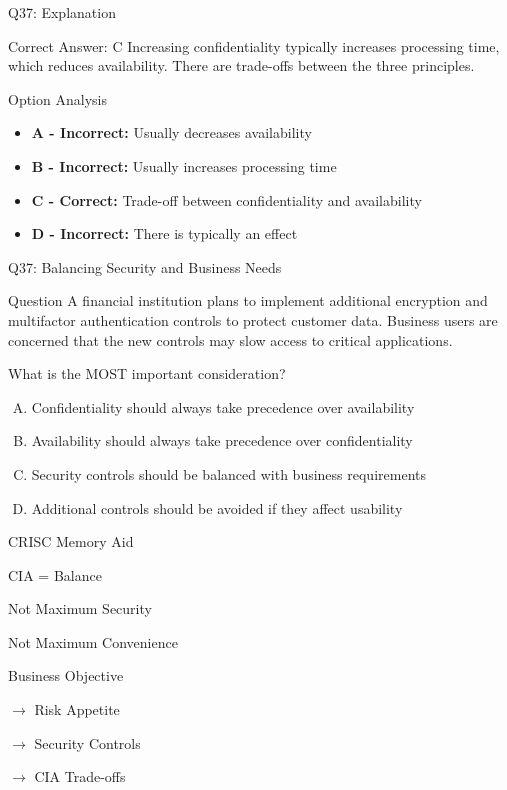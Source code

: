 \documentclass{beamer}
\begin{document}
	\begin{frame}{Q37: Explanation}
		\begin{block}{Correct Answer: C}
			Increasing confidentiality typically increases processing time, which reduces availability. There are trade-offs between the three principles.
		\end{block}
		\begin{block}{Option Analysis}
			\begin{itemize}
				\item \textbf{A - Incorrect:} Usually decreases availability
				\item \textbf{B - Incorrect:} Usually increases processing time
				\item \textbf{C - Correct:} Trade-off between confidentiality and availability
				\item \textbf{D - Incorrect:} There is typically an effect
			\end{itemize}
		\end{block}
	\end{frame}
	
	
	
	
	\begin{frame}[shrink=10]{Q37: Balancing Security and Business Needs}
		\begin{block}{Question}
			A financial institution plans to implement additional encryption
			and multifactor authentication controls to protect customer data.
			Business users are concerned that the new controls may slow access
			to critical applications.
			
			What is the MOST important consideration?
		\end{block}
		
		\begin{enumerate}[(A)]
			\item Confidentiality should always take precedence over availability
			\item Availability should always take precedence over confidentiality
			\item Security controls should be balanced with business requirements
			\item Additional controls should be avoided if they affect usability
		\end{enumerate}
		
		
				\begin{block}{CRISC Memory Aid}
			
			CIA = Balance
			
			Not Maximum Security
			
			Not Maximum Convenience
			
			\vspace{0.15cm}
			
			Business Objective
			
			$\rightarrow$ Risk Appetite
			
			$\rightarrow$ Security Controls
			
			$\rightarrow$ CIA Trade-offs
			
		\end{block}
		
	\end{frame}
	
\end{document}
